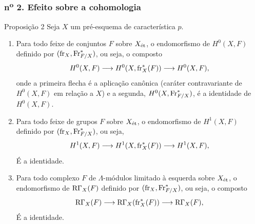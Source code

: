 \subsubsection*{n\textsuperscript{o} 2. Efeito sobre a cohomologia}

\begin{statement}{Proposição 2}
Seja $X$ um pré-esquema de característica $p$.
\begin{enumerate}[label=\alph*)]
\item Para todo feixe de conjuntos $F$ sobre $X_{\mathrm{\acute{e}t}}$, o endomorfismo de $H^0(X,F)$ definido por $(\operatorname{fr}_X,\operatorname{Fr}^*_{F/X})$, ou seja, o composto
\[
H^0(X,F)\longrightarrow H^0(X,\operatorname{fr}_X^*(F))\longrightarrow H^0(X,F),
\]
onde a primeira flecha é a aplicação canônica (caráter contravariante de $H^0(X,F)$ em relação a $X$) e a segunda, $H^0(X,\operatorname{Fr}^*_{F/X})$, é a identidade de $H^0(X,F)$.
\item Para todo feixe de grupos $F$ sobre $X_{\mathrm{\acute{e}t}}$, o endomorfismo de $H^1(X,F)$ definido por $(\operatorname{fr}_X,\operatorname{Fr}^*_{F/X})$, ou seja,
\[
H^1(X,F)\longrightarrow H^1(X,\operatorname{fr}_X^*(F))\longrightarrow H^1(X,F),
\]
É a identidade.
\item Para todo complexo $F$ de $\Lambda$-módulos limitado à esquerda sobre $X_{\mathrm{\acute{e}t}}$, o endomorfismo de $\mathrm{R}\Gamma_X(F)$ definido por $(\operatorname{fr}_X,\operatorname{Fr}^*_{F/X})$, ou seja, o composto
\[
\mathrm{R}\Gamma_X(F)\longrightarrow \mathrm{R}\Gamma_X(\operatorname{fr}_X^*(F))\longrightarrow \mathrm{R}\Gamma_X(F),
\]
É a identidade.
\end{enumerate}
\end{statement}
